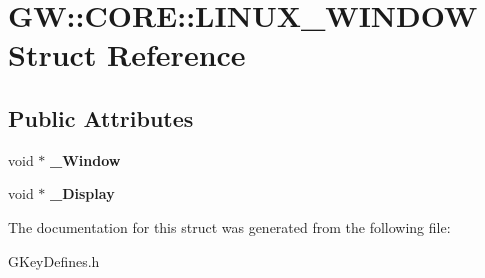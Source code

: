 \hypertarget{struct_g_w_1_1_c_o_r_e_1_1_l_i_n_u_x___w_i_n_d_o_w}{}\section{GW\+:\+:C\+O\+RE\+:\+:L\+I\+N\+U\+X\+\_\+\+W\+I\+N\+D\+OW Struct Reference}
\label{struct_g_w_1_1_c_o_r_e_1_1_l_i_n_u_x___w_i_n_d_o_w}
\subsection*{Public Attributes}
\begin{DoxyCompactItemize}
\item 
\hypertarget{struct_g_w_1_1_c_o_r_e_1_1_l_i_n_u_x___w_i_n_d_o_w_a51fadcfa59276c1c0ab7fdc6af733f4f}{}\label{struct_g_w_1_1_c_o_r_e_1_1_l_i_n_u_x___w_i_n_d_o_w_a51fadcfa59276c1c0ab7fdc6af733f4f} 
void $\ast$ {\bfseries \+\_\+\+Window}
\item 
\hypertarget{struct_g_w_1_1_c_o_r_e_1_1_l_i_n_u_x___w_i_n_d_o_w_a1b1d6b2b7b133fc54f67dcce4c2f1ed5}{}\label{struct_g_w_1_1_c_o_r_e_1_1_l_i_n_u_x___w_i_n_d_o_w_a1b1d6b2b7b133fc54f67dcce4c2f1ed5} 
void $\ast$ {\bfseries \+\_\+\+Display}
\end{DoxyCompactItemize}


The documentation for this struct was generated from the following file\+:\begin{DoxyCompactItemize}
\item 
G\+Key\+Defines.\+h\end{DoxyCompactItemize}

